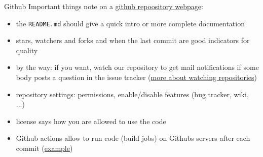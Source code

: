 \begin{frame}[fragile]{Github}
    Important things note on a
    \href{https://github.com/inwe-boku/lecture-scientific-computing/}{github repoository webpage}:
    \begin{itemize}
        \item the \verb|README.md| should give a quick intro or more complete documentation
        \item stars, watchers and forks and when the last commit are good indicators for quality
        \item by the way: if you want, watch our repository to get mail notifications if some body
            posts a question in the issue tracker
            (\href{https://help.github.com/en/github/receiving-notifications-about-activity-on-github/about-notifications}{more about watching repositories})
        \item repository settings: permissions, enable/disable features (bug tracker, wiki, ...)
        \item license says how you are allowed to use the code
        \item Github actions allow to run code (build jobs) on Githubs servers after each commit
            (\href{https://github.com/inwe-boku/lecture-scientific-computing/actions/runs/57614853}{example})
    \end{itemize}
\end{frame}


